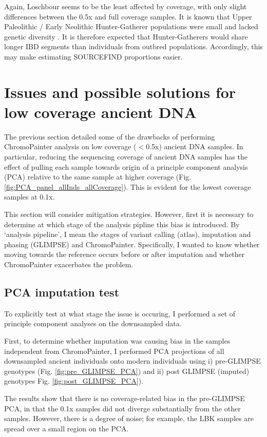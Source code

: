 Again, Loschbour seems to be the least affected by coverage, with only slight differences between the 0.5x and full coverage samples. It is known that Upper Paleolithic / Early Neolithic Hunter-Gatherer populations were small and lacked genetic diversity \cite{excoffier1999hunter, Lazaridis2014, Fu2016}. It is therefore expected that Hunter-Gatherers would share longer IBD segments than individuals from outbred populations. Accordingly, this may make estimating SOURCEFIND proportions easier.


\section{Issues and possible solutions for low coverage ancient DNA}

The previous section detailed some of the drawbacks of performing ChromoPainter analysis on low coverage ($<$0.5x) ancient DNA samples. In particular, reducing the sequencing coverage of ancient DNA samples has the effect of pulling each sample towards origin of a principle component analysis (PCA) relative to the same sample at higher coverage (Fig. \ref{fig:PCA_panel_allInds_allCoverage}). This is evident for the lowest coverage samples at 0.1x. 

This section will consider mitigation strategies. However, first it is necessary to determine at which stage of the analysis pipline this bias is introduced. By `analysis pipeline', I mean the stages of variant calling (atlas), imputation and phasing (GLIMPSE) and ChromoPainter. Specifically, I wanted to know whether moving towards the reference occurs before or after imputation and whether ChromoPainter exacerbates the problem.   

\subsection{PCA imputation test}

To explicitly test at what stage the issue is occuring, I performed a set of principle component analyses on the downsampled data. 

First, to determine whether imputation was causing bias in the samples independent from ChromoPainter, I performed PCA projections of all downsampled ancient individuals onto modern individuals using i) pre-GLIMPSE genotypes (Fig. \ref{fig:pre_GLIMPSE_PCA}) and ii) post GLIMPSE (imputed) genotypes Fig. \ref{fig:post_GLIMPSE_PCA}). 

The results show that there is no coverage-related bias in the pre-GLIMPSE PCA, in that the 0.1x samples did not diverge substantially from the other samples. However, there is a degree of noise; for example, the LBK samples are spread over a small region on the PCA. 

